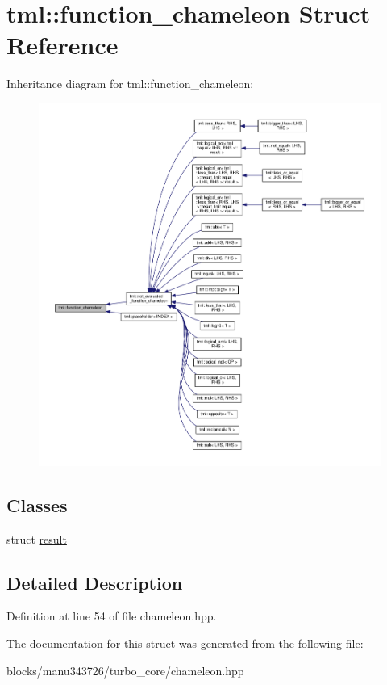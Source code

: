 \hypertarget{structtml_1_1function__chameleon}{\section{tml\+:\+:function\+\_\+chameleon Struct Reference}
\label{structtml_1_1function__chameleon}
}


Inheritance diagram for tml\+:\+:function\+\_\+chameleon\+:
\nopagebreak
\begin{figure}[H]
\begin{center}
\leavevmode
\includegraphics[width=350pt]{structtml_1_1function__chameleon__inherit__graph}
\end{center}
\end{figure}
\subsection*{Classes}
\begin{DoxyCompactItemize}
\item 
struct \hyperlink{structtml_1_1function__chameleon_1_1result}{result}
\end{DoxyCompactItemize}


\subsection{Detailed Description}


Definition at line 54 of file chameleon.\+hpp.



The documentation for this struct was generated from the following file\+:\begin{DoxyCompactItemize}
\item 
blocks/manu343726/turbo\+\_\+core/chameleon.\+hpp\end{DoxyCompactItemize}
